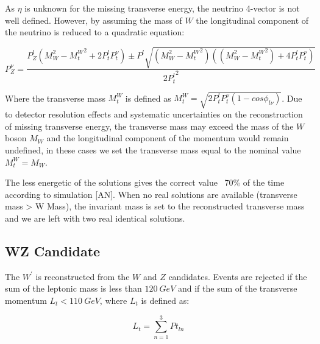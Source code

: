 As $\eta$ is unknown for the missing transverse energy, the neutrino 4-vector is
not well defined. However, by assuming the mass of $W$ the longitudinal component
of the neutrino is reduced to a quadratic equation:

\[
P_{Z}^{\nu} = \frac{P_{Z}^{l}({M_{W}^{2}-{M_{t}^{W}}^2+2P_{t}^{l}{P_{t}^{\nu}}}) \pm P^{l}\sqrt{(M_{W}^{2}-{M_{t}^{W}}^2)((M_{W}^{2}-{M_{t}^{W}}^2)+4P_{t}^{l}P_{t}^{\nu})}}{{2P_{t}^{l}}^{2}}
\]

Where the transverse mass $M_{t}^{W}$ is defined
as ${M_{t}^{W}}=\sqrt{2P_{t}^{l}P_{t}^{\nu}(1-cos\phi_{l\nu})}$.
Due to detector resolution effects and systematic uncertainties on the
reconstruction of missing transverse energy, the transverse mass may
exceed the mass of the $W$ boson $M_W$ and the
longitudinal component of the momentum would remain undefined, in these cases
we set the transverse mass equal to the nominal value $M_{t}^{W}=M_W$.

The less energetic of the solutions gives the correct value ~70\% of the time
according to simulation [AN].
When no real solutions are available (transverse mass > W Mass), the invariant
mass is set to the reconstructed transverse mass and we are left with two real
identical solutions.


\subsection{WZ Candidate}

The $W^{\prime}$ is reconstructed from the $W$ and $Z$ candidates.
Events are rejected if the sum of the leptonic mass is less than $120~GeV$ and
if the sum of the transverse momentum $L_{t}<110~GeV$, where $L_{t}$ is defined
as:

\[
L_{t} = \sum_{n=1}^{3} Pt_{ln}
\]






